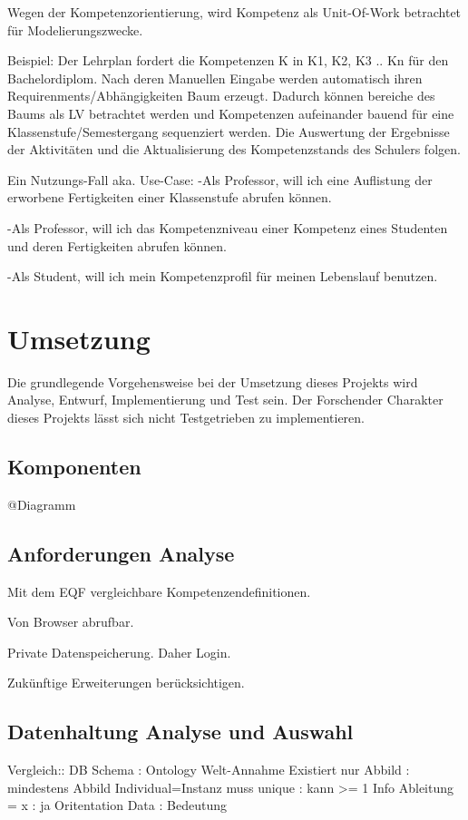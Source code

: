 \documentclass[
12pt,
english,
ngerman,
headsepline,
twoside,
openright,
numbers=noenddot,version=first
]{scrreprt}
\begin{document}
Wegen der Kompetenzorientierung, wird Kompetenz als Unit-Of-Work betrachtet für Modelierungszwecke.

Beispiel:
Der Lehrplan fordert die Kompetenzen K in K1, K2, K3 .. Kn für den Bachelordiplom. Nach deren Manuellen Eingabe werden automatisch
ihren Requirenments/Abhängigkeiten Baum erzeugt. Dadurch können bereiche des Baums als LV betrachtet werden und Kompetenzen aufeinander
bauend für eine Klassenstufe/Semestergang sequenziert werden. Die Auswertung der Ergebnisse der Aktivitäten und die Aktualisierung des Kompetenzstands
des Schulers folgen.

Ein Nutzungs-Fall aka. Use-Case: 
-Als Professor, will ich eine Auflistung der erworbene Fertigkeiten einer Klassenstufe abrufen können.

-Als Professor, will ich das Kompetenzniveau einer Kompetenz eines Studenten und deren Fertigkeiten abrufen können.

-Als Student, will ich mein Kompetenzprofil für meinen Lebenslauf benutzen.

\chapter{Umsetzung}
Die grundlegende Vorgehensweise bei der Umsetzung dieses Projekts wird Analyse, Entwurf, Implementierung und Test sein. Der Forschender Charakter dieses Projekts lässt sich nicht Testgetrieben zu implementieren. 

\section{Komponenten}

@Diagramm

\section{Anforderungen Analyse}
Mit dem EQF vergleichbare Kompetenzendefinitionen.

Von Browser abrufbar. 

Private Datenspeicherung. Daher Login.

Zukünftige Erweiterungen berücksichtigen.

\section{Datenhaltung Analyse und Auswahl}


Vergleich:: DB Schema                       : Ontology
Welt-Annahme Existiert nur Abbild           : mindestens Abbild
Individual=Instanz muss unique              : kann >= 1
Info Ableitung = x                          : ja
Oritentation    Data                        : Bedeutung
\end{document}
